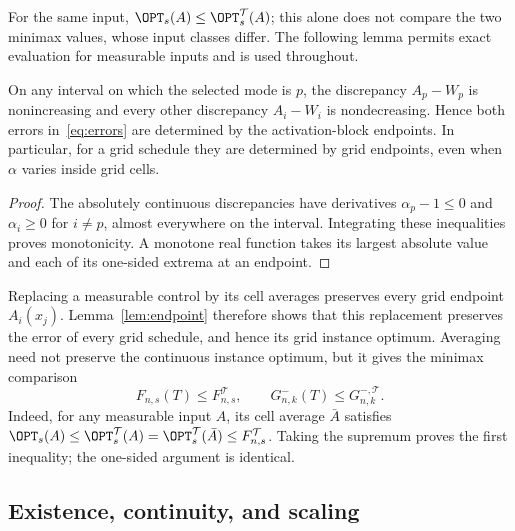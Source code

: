 For the same input, $\OPT_s(A)\le\OPT_s^{\mathcal T}(A)$; this alone does
not compare the two minimax values, whose input classes differ. The following
lemma permits exact evaluation for measurable inputs and is used throughout.

\begin{lemma}\label{lem:endpoint}
On any interval on which the selected mode is $p$, the discrepancy
$A_p-W_p$ is nonincreasing and every other discrepancy $A_i-W_i$ is
nondecreasing. Hence both errors in~\eqref{eq:errors} are determined by the
activation-block endpoints. In particular, for a grid schedule they are
determined by grid endpoints, even when $\alpha$ varies inside grid cells.
\end{lemma}
\begin{proof}
The absolutely continuous discrepancies have derivatives $\alpha_p-1\le0$
and $\alpha_i\ge0$ for $i\ne p$, almost everywhere on the interval. Integrating
these inequalities proves monotonicity. A monotone real function takes its
largest absolute value and each of its one-sided extrema at an endpoint.
\end{proof}

Replacing a measurable control by its cell averages preserves every grid
endpoint $A_i(x_j)$. Lemma~\ref{lem:endpoint} therefore shows that this
replacement preserves the error of every grid schedule, and hence its grid
instance optimum. Averaging need not preserve the continuous instance
optimum, but it gives the minimax comparison
\begin{equation}\label{eq:minimax-grid-domination}
 F_{n,s}(T)\le F^{\mathcal T}_{n,s},\qquad
 G^-_{n,k}(T)\le G^{-,\mathcal T}_{n,k}.
\end{equation}
Indeed, for any measurable input $A$, its cell average $\bar A$ satisfies
$\OPT_s(A)\le\OPT_s^{\mathcal T}(A)=
\OPT_s^{\mathcal T}(\bar A)\le F^{\mathcal T}_{n,s}$.
Taking the supremum proves the first inequality; the one-sided argument is
identical.

\subsection{Existence, continuity, and scaling}

